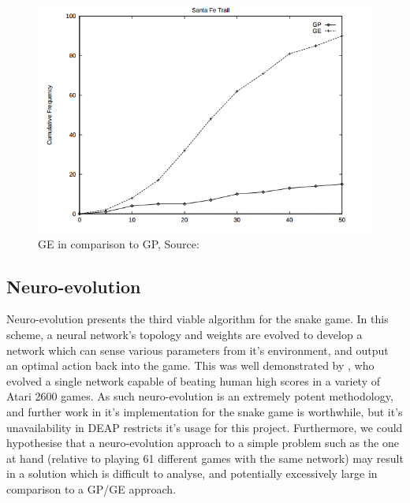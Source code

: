\documentclass[british,10pt,a4paper]{article}
\begin{document}
\begin{figure}
\centering
	\includegraphics[width=12cm,keepaspectratio]{images/gp_vs_ge.png}
	\caption{GE in comparison to GP, Source: \cite{Michael_ONeill1999-zi}}
	\label{fig:gp_vs_ge}
\end{figure}

\subsection{Neuro-evolution}
Neuro-evolution presents the third viable algorithm for the snake game. In this scheme, a neural network's topology and weights are evolved to develop a network which can sense various parameters from it's environment, and output an optimal action back into the game. This was well demonstrated by \citet{Hausknecht2014-uc}, who evolved a single network capable of beating human high scores in a variety of Atari 2600 games. As such neuro-evolution is an extremely potent methodology, and further work in it's implementation for the snake game is worthwhile, but it's unavailability in DEAP restricts it's usage for this project. Furthermore, we could hypothesise that a neuro-evolution approach to a simple problem such as the one at hand (relative to playing 61 different games with the same network) may result in a solution which is difficult to analyse, and potentially excessively large in comparison to a GP/GE approach.
\end{document}
